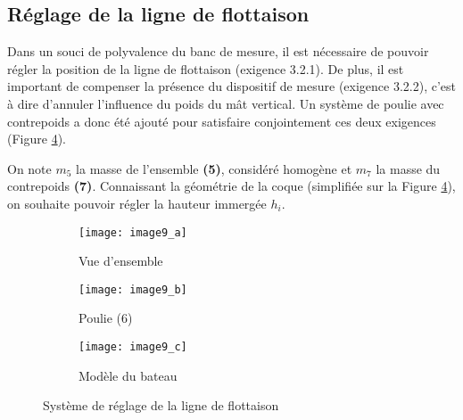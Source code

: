\subsection{Réglage de la ligne de flottaison}
Dans un souci de polyvalence du banc de mesure, il est nécessaire de pouvoir régler la position de la ligne de flottaison (exigence 3.2.1). De plus, il est important de compenser la présence du dispositif de mesure (exigence 3.2.2), c'est à dire d'annuler l'influence du poids du mât vertical. Un système de poulie avec contrepoids a donc été ajouté pour satisfaire conjointement ces deux exigences (Figure \ref{fig:CCMP:2021:09}).

On note $m_5$ la masse de l'ensemble \textbf{(5)}, considéré homogène et $m_7$ la masse du contrepoids \textbf{(7)}. Connaissant la géométrie de la coque (simplifiée sur la Figure \ref{fig:CCMP:2021:09}), on souhaite pouvoir régler la hauteur immergée $h_i$.

\begin{figure}[!h]
\centering
    \begin{subfigure}[b]{.3\textwidth}
    \centering
    \texttt{[image: image9\_a]}
    \caption{\label{fig:CCMP:2021:09:a}Vue d’ensemble }
    \end{subfigure}
    \begin{subfigure}[b]{.3\textwidth}
    \centering
    \texttt{[image: image9\_b]}
    \caption{\label{fig:CCMP:2021:09:b} Poulie (6)}
    \end{subfigure}
    \begin{subfigure}[b]{.3\textwidth}
    \centering
    \texttt{[image: image9\_c]}
    \caption{\label{fig:CCMP:2021:09:c} Modèle du bateau}
    \end{subfigure}
\caption{ \label{fig:CCMP:2021:09}Système de réglage de la ligne de flottaison}
\end{figure}

 
